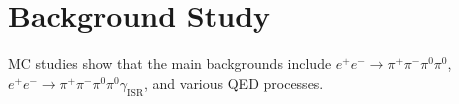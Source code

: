 
\section{Background Study}
\label{sec:bkg_stu}
MC studies show that the main backgrounds include $e^{+}e^{-} \to \pi^{+}\pi^{-}\pi^{0}\pi^{0}$, $e^{+}e^{-} \to \pi^{+}\pi^{-}\pi^{0}\pi^{0}\gamma_{\text{ISR}}$, and various QED processes.

